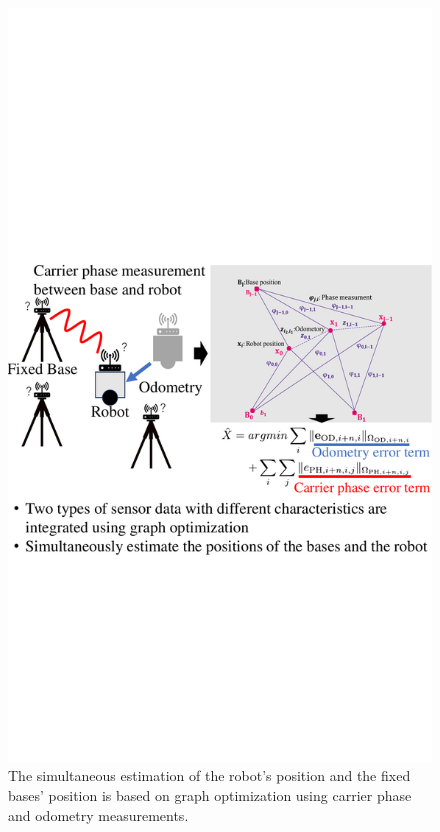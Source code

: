 \documentclass[conference]{IEEEtran}
\begin{document}
\begin{figure}[tb]
    \centering
    \includegraphics[width=0.99\linewidth]{figures/Fig1.pdf}
    \caption{The simultaneous estimation of the robot's position and the fixed bases' position is based on graph optimization using carrier phase and odometry measurements.}
    \label{fig:fig1}
\end{figure}
\end{document}
